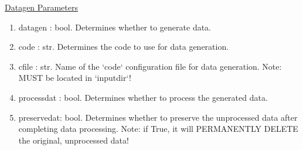 \documentclass[letterpaper, 12pt]{article}
\begin{document}
\noindent \underline{Datagen Parameters}
\begin{enumerate}
\item datagen    : bool. Determines whether to generate data.
\item code       : str.  Determines the code to use for data generation.
\item cfile      : str.  Name of the `code` configuration file for data generation.
                   Note: MUST be located in `inputdir`!
\item processdat : bool. Determines whether to process the generated data.
\item preservedat: bool. Determines whether to preserve the unprocessed data after 
                   completing data processing.
                   Note: if True, it will PERMANENTLY DELETE the original, 
                         unprocessed data!
\end{enumerate}
\end{document}
